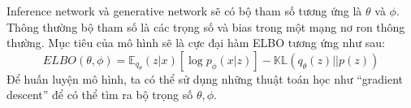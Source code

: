         Inference network và generative network sẽ có bộ tham số tương ứng là $\theta$ và $\phi$.
        Thông thường bộ tham số là các trọng số và bias trong một mạng nơ ron thông thường. 
        Mục tiêu của mô hình sẽ là cực đại hàm ELBO tương ứng như sau:
        \begin{equation}
        \label{ELBO2}
            ELBO(\theta,\phi) = \mathbb{E}_{q_\theta}(z|x)[\log p_\phi(x|z)] - \mathbb{KL}(q_\theta(z)||p(z))
        \end{equation}
        Để huấn luyện mô hình, ta có thể sử dụng những thuật toán học như ``gradient descent'' để có thể tìm ra bộ trọng số $\theta,\phi$.